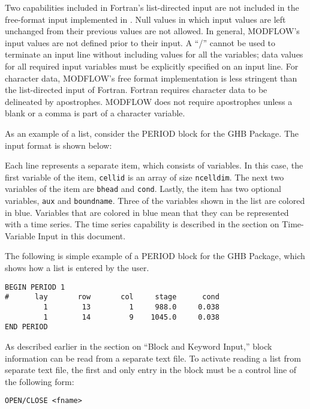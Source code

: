 Two capabilities included in Fortran's list-directed input are not included in the free-format input implemented in \mf. Null values in which input values are left unchanged from their previous values are not allowed. In general, MODFLOW's input values are not defined prior to their input.  A ``/'' cannot be used to terminate an input line without including values for all the variables; data values for all required input variables must be explicitly specified on an input line.  For character data, MODFLOW's free format implementation is less stringent than the list-directed input of Fortran. Fortran requires character data to be delineated by apostrophes. MODFLOW does not require apostrophes unless a blank or a comma is part of a character variable.

As an example of a list, consider the PERIOD block for the GHB Package.  The input format is  shown below:



Each line represents a separate item, which consists of variables.  In this case, the first variable of the item, \texttt{cellid} is an array of size \texttt{ncelldim}.  The next two variables of the item are \texttt{bhead} and \texttt{cond}.  Lastly, the item has two optional variables, \texttt{aux} and \texttt{boundname}.  Three of the variables shown in the list are colored in blue.  Variables that are colored in blue mean that they can be represented with a time series.  The time series capability is described in the section on Time-Variable Input in this document.  

The following is simple example of a PERIOD block for the GHB Package, which shows how a list is entered by the user.

\begin{lstlisting}[style=inputfile]
BEGIN PERIOD 1
#      lay       row       col     stage      cond
         1        13         1     988.0     0.038
         1        14         9    1045.0     0.038
END PERIOD
\end{lstlisting}

As described earlier in the section on ``Block and Keyword Input,'' block information can be read from a separate text file.  To activate reading a list from separate text file, the first and only entry in the block must be a control line of the following form:  

\begin{lstlisting}[style=blockdefinition]
  OPEN/CLOSE <fname>
\end{lstlisting}

